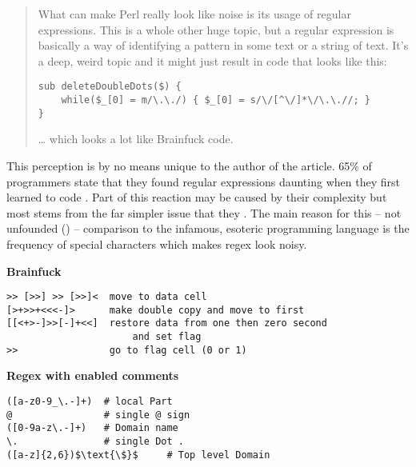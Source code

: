 {\small
\begin{quote}
    What can make Perl really look like noise is its usage of regular expressions. This is a whole other huge topic, but a regular expression is basically a way of identifying a pattern in some text or a string of text. It's a deep, weird topic and it might just result in code that looks like this:

\vspace{1cm}
\begin{minipage}{\linewidth}
\begin{verbatim}
sub deleteDoubleDots($) { 
    while($_[0] = m/\.\./) { $_[0] = s/\/[^\/]*\/\.\.//; } 
}
\end{verbatim}
\end{minipage}

… which looks a lot like Brainfuck code.
\end{quote}

}

This perception is by no means unique to the author of the article. 65\% of programmers state that they found regular expressions daunting when they first learned to code \cite{RegexesAreHard}. Part of this reaction may be caused by their complexity but most stems from the far simpler issue that they  \cite{ViceProgrammingLanguagesProgrammersHate}. The main reason for this  -- not unfounded () -- comparison to the infamous, esoteric programming language is the frequency of special characters which makes regex look noisy.


{
\hypersetup{citecolor=white}
\begin{listingBox}[title={Comparison of Regex \cite{regexWithComments} and Brainfuck \cite{brainfuckExample}},label=fig:regexVsBrainfuck,width=15.7cm,center]
\begin{flushleft} \textbf{Brainfuck} \end{flushleft}
\vspace{-1em}
\begin{lstlisting}[basicstyle=\ttfamily]
>> [>>] >> [>>]<  move to data cell
[>+>>+<<<-]>      make double copy and move to first
[[<+>-]>>[-]+<<]  restore data from one then zero second 
                      and set flag
>>                go to flag cell (0 or 1)
\end{lstlisting}
\tcblower
\textbf{Regex with enabled comments}
    \begin{lstlisting}[basicstyle=\ttfamily,mathescape=true]
([a-z0-9_\.-]+)  # local Part
@                # single @ sign
([0-9a-z\.-]+)   # Domain name
\.               # single Dot .
([a-z]{2,6})$\text{\$}$     # Top level Domain
\end{lstlisting}
\end{listingBox}
}


